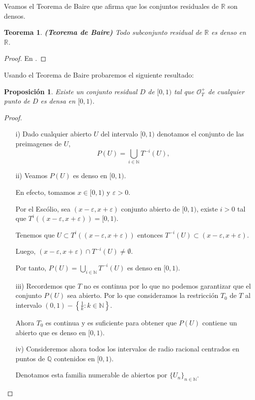 \documentclass[12pt]{report}
\newtheorem{prop}{Proposición}[section]
\newtheorem{teo}{Teorema}[section]
\begin{document}
Veamos el Teorema de Baire que afirma que los conjuntos residuales de $\mathbb{R}$ son densos.
\begin{teo}
\textbf{(Teorema de Baire)} Todo subconjunto residual de $\mathbb{R}$ es denso en $\mathbb{R}$. 
\end{teo}
\begin{proof}
En \cite{Portugues}.
\end{proof}

Usando el Teorema de Baire probaremos el siguiente resultado:

\begin{prop}
Existe un conjunto residual $D$ de $[0,1)$ tal que $\mathcal{O}_{T}^{+}$ de cualquier punto de $D$ es densa en $[0,1)$.
\end{prop}
\begin{proof}\hfill
\begin{itemize}
    \item[i)] Dado cualquier abierto $U$ del intervalo $[0,1)$ denotamos el conjunto de las preimagenes de $U$,
    $$
    P(U)=\displaystyle\bigcup_{i\in\mathbb{N}}T^{-i}(U),
    $$
    \item[ii)] Veamos $P(U)$ es denso en $[0,1)$.
    
    En efecto, tomamos $x\in[0,1)$ y $\varepsilon>0$. 
    
    Por el Escólio, sea $(x-\varepsilon,x+\varepsilon)$ conjunto abierto de $[0,1)$, existe $i>0$ tal que $T^{i}((x-\varepsilon,x+\varepsilon))=[0,1)$.
    
    Tenemos que $U\subset T^{i}((x-\varepsilon,x+\varepsilon))$ entonces $T^{-i}(U)\subset(x-\varepsilon,x+\varepsilon)$.
    
    Luego, $(x-\varepsilon,x+\varepsilon)\cap T^{-i}(U)\neq\emptyset$.
    
    Por tanto, $P(U)=\displaystyle\bigcup_{i\in\mathbb{N}}T^{-i}(U)$ es denso en $[0,1)$.
    \item[iii)] Recordemos que $T$ no es continua por lo que no podemos garantizar que el conjunto $P(U)$ sea abierto. Por lo que consideramos la restricción $T_{0}$ de $T$ al intervalo $(0,1)-\left\{\frac{1}{k}:k\in\mathbb{N}\right\}$.
    
    Ahora $T_{0}$ es continua y es suficiente para obtener que $P(U)$ contiene un abierto que es denso en $[0,1)$.
    \item[iv)] Consideremos ahora todos los intervalos de radio racional centrados en puntos de $\mathbb{Q}$ contenidos en $[0,1)$.
    
    Denotamos esta familia numerable de abiertos por $\{U_{n}\}_{n\in\mathbb{N}}$.
    

\end{itemize}
\end{proof}
\end{document}
